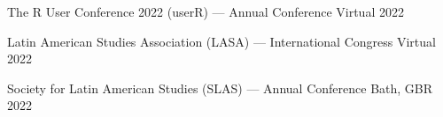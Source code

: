 \begin{cvhonors}
\cvconf
{The R User Conference 2022 (userR) --- Annual Conference} 
{Virtual}
{2022}
\end{cvhonors}

\begin{cvhonors}
\cvconf
{Latin American Studies Association (LASA) --- International Congress} 
{Virtual}
{2022}
\end{cvhonors}

\begin{cvhonors}
\cvconf
{Society for Latin American Studies (SLAS) --- Annual Conference} 
{Bath, GBR}
{2022}
\end{cvhonors}









